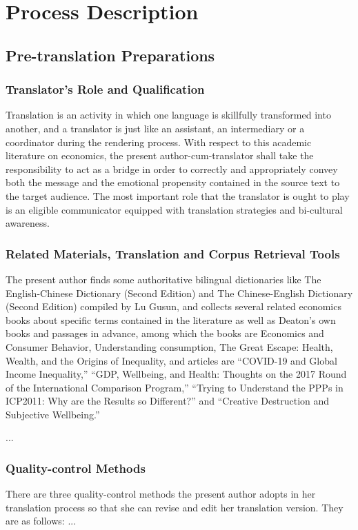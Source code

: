 \chapter{Process Description}
\section{Pre-translation Preparations}
	\subsection{Translator’s Role and Qualification}
	Translation is an activity in which one language is skillfully transformed into another, and a translator is just like an assistant, an intermediary or a coordinator during the rendering process. With respect to this academic literature on economics, the present author-cum-translator shall take the responsibility to act as a bridge in order to correctly and appropriately convey both the message and the emotional propensity contained in the source text to the target audience. The most important role that the translator is ought to play is an eligible communicator equipped with translation strategies and bi-cultural awareness.
	\subsection{Related Materials, Translation and Corpus Retrieval Tools}
	The present author finds some authoritative bilingual dictionaries like The English-Chinese Dictionary (Second Edition) and The Chinese-English Dictionary (Second Edition) compiled by Lu Gusun, and collects several related economics books about specific terms contained in the literature as well as Deaton’s own books and passages in advance, among which the books are Economics and Consumer Behavior, Understanding consumption, The Great Escape: Health, Wealth, and the Origins of Inequality, and articles are “COVID-19 and Global Income Inequality,” “GDP, Wellbeing, and Health: Thoughts on the 2017 Round of the International Comparison Program,” “Trying to Understand the PPPs in ICP2011: Why are the Results so Different?” and “Creative Destruction and Subjective Wellbeing.”
	
	...
	\subsection{ Quality-control Methods}
	There are three quality-control methods the present author adopts in her translation process so that she can revise and edit her translation version. They are as follows:
	...
	
